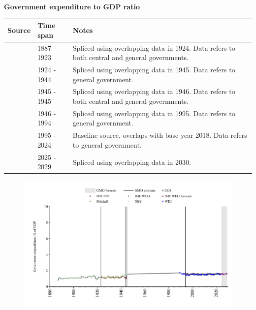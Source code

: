 \documentclass[12pt,a4paper,landscape]{article}
\begin{document}
\begin{adjustbox}{max totalsize={\paperwidth}{\paperheight},center}
\begin{minipage}[t][\textheight][t]{\textwidth}
\vspace*{0.5cm}
{}
\begin{center}
{\Large\bfseries Government expenditure to GDP ratio}
\end{center}
\vspace{0.5cm}
\begin{table}[H]
\centering
\small
\begin{tabular}{|l|l|l|}
\hline
\textbf{Source} & \textbf{Time span} & \textbf{Notes} \\
\hline
\rowcolor{white}\cite{NBS}& 1887 - 1923 &Spliced using overlapping data in 1924. Data refers to both central and general governments.\\
\rowcolor{lightgray}\cite{IMF_FPP}& 1924 - 1944 &Spliced using overlapping data in 1945. Data refers to general government.\\
\rowcolor{white}\cite{NBS}& 1945 - 1945 &Spliced using overlapping data in 1946. Data refers to both central and general governments.\\
\rowcolor{lightgray}\cite{WDI}& 1946 - 1994 &Spliced using overlapping data in 1995. Data refers to general government.\\
\rowcolor{white}\cite{EUS}& 1995 - 2024 &Baseline source, overlaps with base year 2018. Data refers to general government.\\
\rowcolor{lightgray}\cite{IMF_WEO_forecast}& 2025 - 2029 &Spliced using overlapping data in 2030. \\
\hline
\end{tabular}
\end{table}
\begin{figure}[H]
\centering
\includegraphics[width=\textwidth,height=0.6\textheight,keepaspectratio]{graphs/BGR_govexp_GDP.pdf}
\end{figure}
\end{minipage}
\end{adjustbox}
\end{document}
